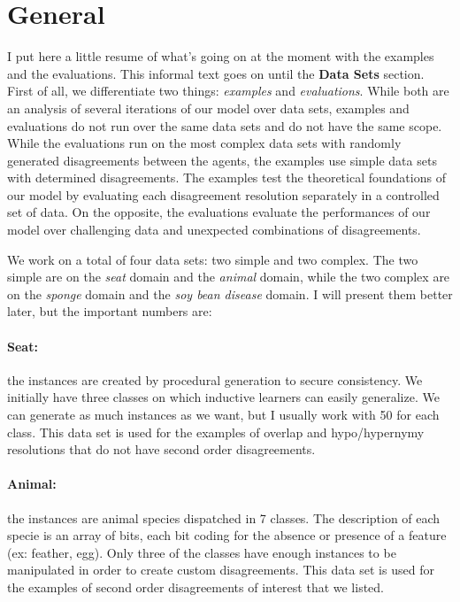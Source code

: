 \section{General}

I put here a little resume of what's going on at the moment with the examples and the evaluations. This informal text goes on until the \textbf{Data Sets} section. First of all, we differentiate two things: \emph{examples} and \emph{evaluations}. While both are an analysis of several iterations of our model over data sets, examples and evaluations do not run over the same data sets and do not have the same scope. While the evaluations run on the most complex data sets with randomly generated disagreements between the agents, the examples use simple data sets with determined disagreements. The examples test the theoretical foundations of our model by evaluating each disagreement resolution separately in a controlled set of data. On the opposite, the evaluations evaluate the performances of our model over challenging data and unexpected combinations of disagreements.

We work on a total of four data sets: two simple and two complex. The two simple are on the \emph{seat} domain and the \emph{animal} domain, while the two complex are on the \emph{sponge} domain and the \emph{soy bean disease} domain. I will present them better later, but the important numbers are:

\paragraph{Seat:} the instances are created by procedural generation to secure consistency. We initially have three classes on which inductive learners can easily generalize. We can generate as much instances as we want, but I usually work with 50 for each class. This data set is used for the examples of overlap and hypo/hypernymy resolutions that do not have second order disagreements.

\paragraph{Animal:} the instances are animal species dispatched in 7 classes. The description of each specie is an array of bits, each bit coding for the absence or presence of a feature (ex: feather, egg). Only three of the classes have enough instances to be manipulated in order to create custom disagreements. This data set is used for the examples of second order disagreements of interest that we listed.

